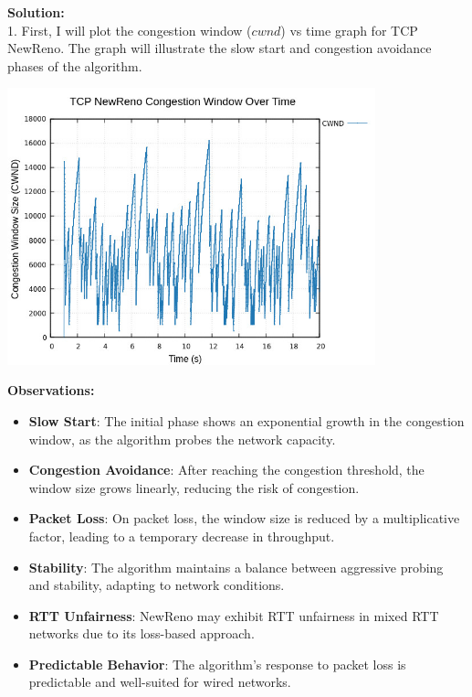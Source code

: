 \documentclass[11pt,a4paper]{article}
\begin{document}
\Large{\textbf{Solution:}}\\
\normalsize
1. First, I will plot the congestion window ($cwnd$) vs time graph for TCP NewReno. The graph will illustrate the slow start and congestion avoidance phases of the algorithm.
\begin{center}
    \includegraphics[width=0.8\textwidth]{images/new_reno_cwnd.jpg}
\end{center}

\textbf{Observations:}
\begin{itemize}
    \item \textbf{Slow Start}: The initial phase shows an exponential growth in the congestion window, as the algorithm probes the network capacity.
    \item \textbf{Congestion Avoidance}: After reaching the congestion threshold, the window size grows linearly, reducing the risk of congestion.
    \item \textbf{Packet Loss}: On packet loss, the window size is reduced by a multiplicative factor, leading to a temporary decrease in throughput.
    \item \textbf{Stability}: The algorithm maintains a balance between aggressive probing and stability, adapting to network conditions.
    \item \textbf{RTT Unfairness}: NewReno may exhibit RTT unfairness in mixed RTT networks due to its loss-based approach.
    \item \textbf{Predictable Behavior}: The algorithm's response to packet loss is predictable and well-suited for wired networks.
\end{itemize}
\end{document}
